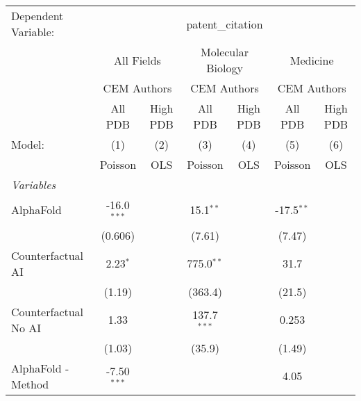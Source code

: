 \begingroup
\centering
\begin{tabular}{lcccccc}
   \tabularnewline \midrule \midrule
   Dependent Variable: & \multicolumn{6}{c}{patent\_citation}\\
 & \multicolumn{2}{c}{All Fields} & \multicolumn{2}{c}{Molecular Biology} & \multicolumn{2}{c}{Medicine} \\
\cmidrule(lr){2-3} \cmidrule(lr){4-5} \cmidrule(lr){6-7}
 & \multicolumn{2}{c}{CEM Authors} & \multicolumn{2}{c}{CEM Authors} & \multicolumn{2}{c}{CEM Authors} \\
\cmidrule(lr){2-3} \cmidrule(lr){4-5} \cmidrule(lr){6-7}
 & \multicolumn{1}{c}{All PDB} & \multicolumn{1}{c}{High PDB} & \multicolumn{1}{c}{All PDB} & \multicolumn{1}{c}{High PDB} & \multicolumn{1}{c}{All PDB} & \multicolumn{1}{c}{High PDB} \\
\cmidrule(lr){2-2} \cmidrule(lr){3-3} \cmidrule(lr){4-4} \cmidrule(lr){5-5} \cmidrule(lr){6-6} \cmidrule(lr){7-7}
   Model:                                                     & (1)           & (2)  & (3)            & (4)  & (5)           & (6)\\  
                                                              &  Poisson      & OLS  & Poisson        & OLS  & Poisson       & OLS\\  
   \midrule
   \emph{Variables}\\
   AlphaFold                                                  & -16.0$^{***}$ &      & 15.1$^{**}$    &      & -17.5$^{**}$  &   \\   
                                                              & (0.606)       &      & (7.61)         &      & (7.47)        &   \\   
   Counterfactual AI                                          & 2.23$^{*}$    &      & 775.0$^{**}$   &      & 31.7          &   \\   
                                                              & (1.19)        &      & (363.4)        &      & (21.5)        &   \\   
   Counterfactual No AI                                       & 1.33          &      & 137.7$^{***}$  &      & 0.253         &   \\   
                                                              & (1.03)        &      & (35.9)         &      & (1.49)        &   \\   
   AlphaFold - Method                                         & -7.50$^{***}$ &      &                &      & 4.05          &   \\   

\end{tabular}
